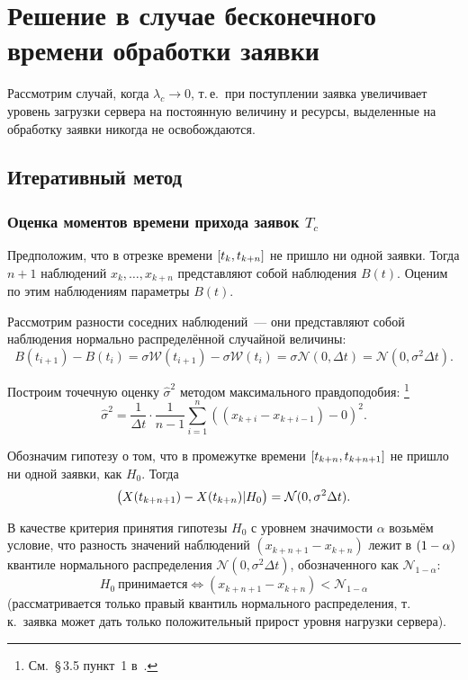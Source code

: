\documentclass[a4paper,10pt]{article}
\begin{document}
\section{Решение в случае бесконечного времени обработки заявки}
Рассмотрим случай, когда $\lambda_c \rightarrow 0$, 
т.\,е.~при поступлении заявка увеличивает уровень загрузки 
сервера на постоянную величину и ресурсы, выделенные на обработку заявки
никогда не освобождаются.

\subsection{Итеративный метод}
\subsubsection{Оценка моментов времени прихода заявок $T_c$}
Предположим, что в отрезке времени $\sbr{t_k, t_{k+n}}$ 
не пришло ни одной заявки.
Тогда $n + 1$ наблюдений $x_k,\ldots,x_{k+n}$ представляют собой наблюдения
$B(t)$.
Оценим по этим наблюдениям параметры $B(t)$.

Рассмотрим разности соседних наблюдений~--- они представляют собой наблюдения 
нормально распределённой случайной величины:
$$B(t_{i+1}) - B(t_i) = 
    \sigma \mathcal{W}(t_{i+1}) - \sigma \mathcal{W}(t_i) = 
    \sigma \mathcal{N}(0, \Delta t) = 
    \mathcal{N}(0, \sigma^2 \Delta t).$$

Построим точечную оценку $\widehat{\sigma}^2$ 
методом максимального правдоподобия:%
\footnote{См.~\S\,3.5 пункт~1 в~\cite{ivchmed2010matstat}.}
%
$$\widehat{\sigma}^2 = 
    \frac{1}{\Delta t}\cdot\frac{1}{n-1}
        \sum\limits_{i=1}^n ((x_{k+i} - x_{k+i-1}) - 0)^2.$$

Обозначим гипотезу о том, что в промежутке времени 
$\sbr{t_{k+n}, t_{k+n+1}}$ не пришло ни одной заявки, 
как $H_0$.
Тогда 
$$\del{X(t_{k+n+1})-X(t_{k+n}) \vert H_0} = 
    \mathcal{N}(0, \sigma^2 \Delta t).$$

В качестве критерия принятия гипотезы $H_0$ с уровнем значимости 
$\alpha$ 
возьмём условие, что разность значений наблюдений $(x_{k+n+1}-x_{k+n})$
лежит в $\del{1 - \alpha}$ квантиле
нормального распределения $\mathcal{N}(0, \sigma^2 \Delta t)$,
обозначенного как $\mathcal{N}_{1 - \alpha}$:
$$
H_0 \  \mathrm{\text{принимается}} \iff
        (x_{k+n+1}-x_{k+n}) < 
	    \mathcal{N}_{1 - \alpha}
$$
(рассматривается только правый квантиль нормального распределения, 
т.\,к.~заявка может дать только положительный прирост уровня нагрузки 
сервера).
\end{document}
